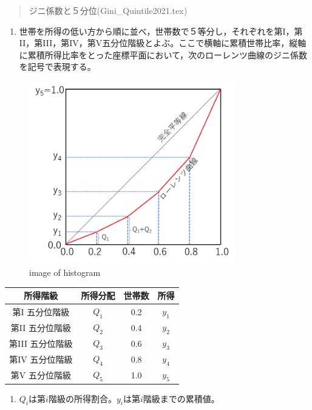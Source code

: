 \documentclass[
]{book}
\providecommand{\tightlist}{%
  \setlength{\itemsep}{0pt}\setlength{\parskip}{0pt}}
\theoremstyle{definition}
\theoremstyle{definition}
\theoremstyle{definition}
\theoremstyle{definition}
\theoremstyle{remark}
\begin{document}
\begin{quote}
ジニ係数と５分位(Gini\_Quintile2021.tex)
\end{quote}

\begin{enumerate}
\def\labelenumi{\arabic{enumi}.}
\tightlist
\item
  世帯を所得の低い方から順に並べ，世帯数で５等分し，それぞれを第I，第II，第III，第IV，第V五分位階級とよぶ。ここで横軸に累積世帯比率，縦軸に累積所得比率をとった座標平面において，次のローレンツ曲線のジニ係数を記号で表現する。
\end{enumerate}

\begin{figure}
\centering
\includegraphics[width=0.8\textwidth,height=\textheight]{images/lec04/GINI_GRAPH.png}
\caption{image of histogram}
\end{figure}

\begin{longtable}[]{@{}cccc@{}}
\toprule()
所得階級 & 所得分配 & 世帯数 & 所得 \\
\midrule()
\endhead
第I 五分位階級 & \(Q_1\) & 0.2 & \(y_1\) \\
第II 五分位階級 & \(Q_2\) & 0.4 & \(y_2\) \\
第III 五分位階級 & \(Q_3\) & 0.6 & \(y_3\) \\
第IV 五分位階級 & \(Q_4\) & 0.8 & \(y_4\) \\
第V 五分位階級 & \(Q_5\) & 1.0 & \(y_5\) \\
\bottomrule()
\end{longtable}

\begin{enumerate}
\def\labelenumi{\arabic{enumi}.}
\setcounter{enumi}{2}
\tightlist
\item
  \(Q_i\)は第\(i\)階級の所得割合。\(y_i\)は第\(i\)階級までの累積値。
\end{enumerate}
\end{document}
